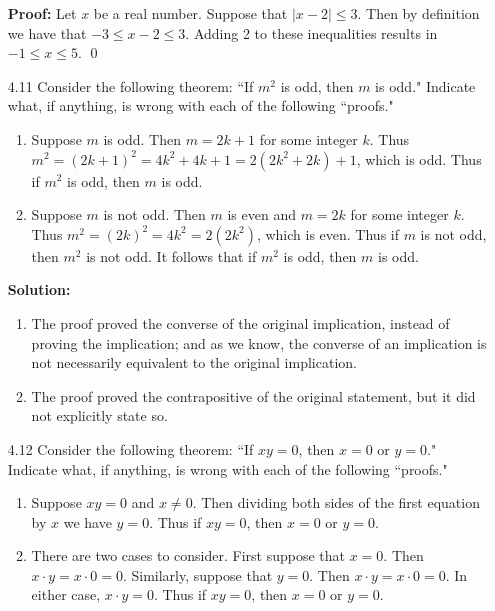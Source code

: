 \begin{enumerate}
		\textbf{Proof:} Let $x$ be a real number. Suppose that $|x - 2| \le 3$.
		Then by definition we have that $-3 \le x - 2 \le 3$. Adding 2 to these
		inequalities results in $-1 \le x \le 5$. \qed
   \item[4.11] Consider the following theorem:
               ``If $m^2$ is odd, then $m$ is odd." Indicate what, if anything, 
               is wrong with each of the following ``proofs."
               \begin{enumerate}
                  \item Suppose $m$ is odd. Then $m = 2k + 1$ for some integer
                        $k$. Thus $m^2 = (2k + 1)^2 = 4k^2 + 4k + 1 =
                        2(2k^2 + 2k) + 1$, which is odd. Thus if $m^2$ is odd,
                        then $m$ is odd.
                  \item Suppose $m$ is not odd. Then $m$ is even and $m = 2k$ 
                        for some integer $k$. Thus
                        $m^2 = (2k)^2 = 4k^2 = 2(2k^2)$, which is even. Thus if
                        $m$ is not odd, then $m^2$ is not odd. It follows that
                        if $m^2$ is odd, then $m$ is odd.
               \end{enumerate}
					
		\textbf{Solution:}
		
		\begin{enumerate}
			\item	The proof proved the converse of the original implication,
					instead of proving the implication; and as we know, the converse
					of an implication is not necessarily equivalent to the original
					implication.
			\item	The proof proved the contrapositive of the original statement,
					but it did not explicitly state so.
      \end{enumerate} 
   \item[4.12] Consider the following theorem: ``If $xy = 0$, then $x = 0$ or
               $y = 0$." Indicate what, if anything, is wrong with each of the
               following ``proofs."
               \begin{enumerate}
                  \item Suppose $xy = 0$ and $x \neq 0$. Then dividing both
                        sides of the first equation by $x$ we have $y = 0$. Thus
                        if $xy = 0$, then $x = 0$ or $y = 0$.
                  \item There are two cases to consider. First suppose that
                        $x = 0$. Then $x \cdot y = x \cdot 0 = 0$. Similarly,
                        suppose that $y = 0$. Then $x \cdot y = x \cdot 0 = 0$.
                        In either case, $x \cdot y = 0$. Thus if $xy = 0$, then
                        $x = 0$ or $y = 0$.
               \end{enumerate}
					

\end{enumerate}
